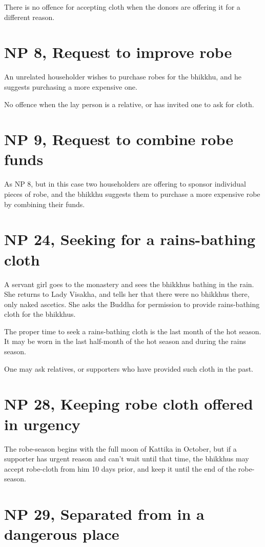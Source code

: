 There is no offence for accepting cloth when the donors are offering it
for a different reason.

\section{NP 8, Request to improve robe}

An unrelated householder wishes to purchase robes for the bhikkhu, and
he suggests purchasing a more expensive one.

No offence when the lay person is a relative, or has invited one to ask
for cloth.

\section{NP 9, Request to combine robe funds}

As NP 8, but in this case two householders are offering to sponsor
individual pieces of robe, and the bhikkhu suggests them to purchase a
more expensive robe by combining their funds.

\section{NP 24, Seeking for a rains-bathing cloth}

A servant girl goes to the monastery and sees the bhikkhus bathing in
the rain. She returns to Lady Visakha, and tells her that there were no
bhikkhus there, only naked ascetics. She asks the Buddha for permission
to provide rains-bathing cloth for the bhikkhus.

The proper time to seek a rains-bathing cloth is the last month of the
hot season. It may be worn in the last half-month of the hot season and
during the rains season.

One may ask relatives, or supporters who have provided such cloth in the
past.

\section{NP 28, Keeping robe cloth offered in urgency}

The robe-season begins with the full moon of Kattika in October, but if
a supporter has urgent reason and can't wait until that time, the
bhikkhus may accept robe-cloth from him 10 days prior, and keep it until
the end of the robe-season.

\section{NP 29, Separated from in a dangerous place}

